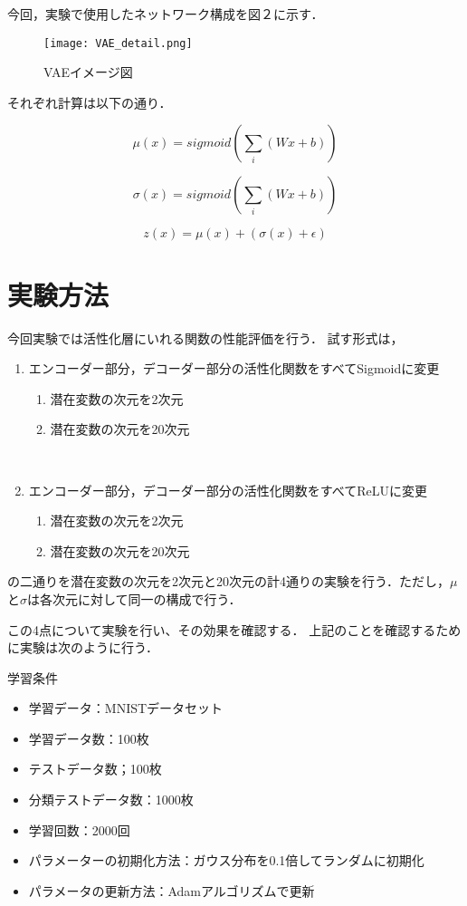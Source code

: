 \documentclass[12pt]{jsarticle}
\begin{document}
今回，実験で使用したネットワーク構成を図２に示す．

\begin{figure}[ht]
  \begin{center}
    \texttt{[image: VAE\_detail.png]}
    \caption{VAEイメージ図}
  \end{center}
\end{figure}

それぞれ計算は以下の通り．

\[
  \mu(x) = sigmoid (\sum_{i} (Wx+b))
\]

\[
  \sigma(x) = sigmoid ( \sum_{i} (Wx+b))
\]


\[
  z(x) = \mu(x)  + ( \sigma(x)+\epsilon)
\]




\clearpage
\section{実験方法}

今回実験では活性化層にいれる関数の性能評価を行う．
試す形式は，

\begin{enumerate}
    \item エンコーダー部分，デコーダー部分の活性化関数をすべてSigmoidに変更
  \begin{enumerate}
    \item 潜在変数の次元を2次元
    \item 潜在変数の次元を20次元
  \end{enumerate}
　\item エンコーダー部分，デコーダー部分の活性化関数をすべてReLUに変更
  \begin{enumerate}
    \item 潜在変数の次元を2次元
    \item 潜在変数の次元を20次元
  \end{enumerate}
\end{enumerate}



の二通りを潜在変数の次元を2次元と20次元の計4通りの実験を行う．ただし，$\mu$と$\sigma$は各次元に対して同一の構成で行う．


この4点について実験を行い、その効果を確認する．
上記のことを確認するために実験は次のように行う．

学習条件
\begin{itemize}
  \item 学習データ：MNISTデータセット
  \item 学習データ数：100枚
  \item テストデータ数；100枚
  \item 分類テストデータ数：1000枚
  \item 学習回数：2000回
  \item パラメーターの初期化方法：ガウス分布を0.1倍してランダムに初期化
  \item パラメータの更新方法：Adamアルゴリズムで更新
\end{itemize}
\end{document}
